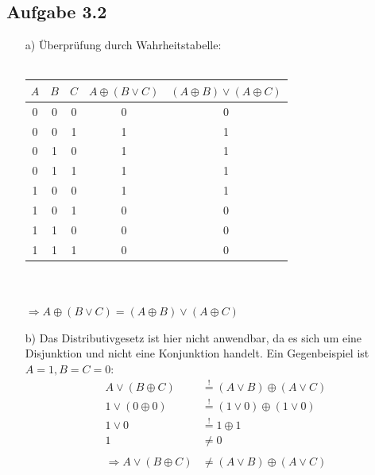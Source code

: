 \documentclass{article}
\begin{document}
    \subsection*{Aufgabe 3.2}
    \begin{enumerate}
        \item[a)] Überprüfung durch Wahrheitstabelle:\\\\
        \begin{tabular}{ccc|c|c}
            $A$ & $B$ & $C$ & $A \oplus (B \lor C)$ & $(A \oplus B) \lor (A \oplus C)$ \\
            \hline
            0 & 0 & 0 & 0 & 0 \\
            0 & 0 & 1 & 1 & 1 \\
            0 & 1 & 0 & 1 & 1 \\
            0 & 1 & 1 & 1 & 1 \\
            1 & 0 & 0 & 1 & 1 \\
            1 & 0 & 1 & 0 & 0 \\
            1 & 1 & 0 & 0 & 0 \\
            1 & 1 & 1 & 0 & 0
        \end{tabular}\\\\
        $\Rightarrow A \oplus (B \lor C) = (A \oplus B) \lor (A \oplus C)$
        \item[b)] Das Distributivgesetz ist hier nicht anwendbar, da es sich um eine Disjunktion und nicht eine Konjunktion handelt. Ein Gegenbeispiel ist $A=1, B=C=0$:
        \begin{align*}
            A \lor (B \oplus C) &\stackrel{!}{=} (A \lor B) \oplus (A \lor C) \\
            1 \lor (0 \oplus 0) &\stackrel{!}{=} (1 \lor 0) \oplus (1 \lor 0) \\
            1 \lor 0 &\stackrel{!}{=} 1 \oplus 1 \\
            1 &\neq 0 \\\\
            \Rightarrow A \lor (B \oplus C) &\neq (A \lor B) \oplus (A \lor C) 
        \end{align*}
    \end{enumerate}
\end{document}

